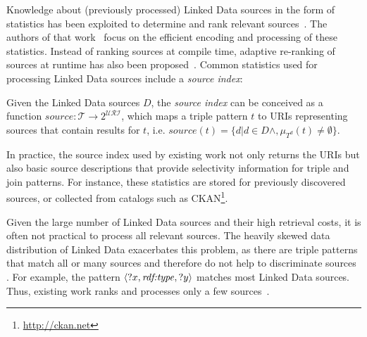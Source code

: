 Knowledge about (previously processed) Linked Data sources in the form of statistics has been exploited 
to determine and rank relevant sources~\cite{harth_data_2010}. 
The authors of that work~\cite{harth_data_2010} focus on the efficient
encoding and processing of these statistics. Instead of ranking
sources at compile time, adaptive re-ranking of sources at runtime has
also been proposed~\cite{ladwig_linked_2010}. Common statistics used
for processing Linked Data sources include a \emph{source index}:
\begin{definition}
  \label{def:index}
  Given the Linked Data sources $D$, the \emph{source index} can be
  conceived as a function $source : \mathcal{T} \to 2^\mathcal{URI}$,
  which maps a triple pattern $t$ to URIs representing sources that
  contain results for $t$, i.e. $source(t) = \{d| d \in D \wedge,
  \mu_{T^d}(t) \neq \emptyset \}$.
\end{definition}
In practice, the source index used by existing work not only returns
the URIs but also basic source descriptions that provide selectivity
information for triple and join patterns. For instance, these
statistics are stored for previously discovered sources, or collected
from catalogs such as
CKAN\footnote{\url{http://ckan.net}}.

Given the large number of Linked Data sources and their high retrieval costs, it is often not practical to process all relevant sources. The heavily skewed data
distribution of Linked Data exacerbates this problem, as there are
triple patterns that match all or many sources and therefore do not
help to discriminate sources \cite{ladwig_linked_2010}. For example, 
the pattern $\langle ?x, \mbox{\emph{rdf:type}}, ?y \rangle$ matches most Linked Data sources. Thus, existing work ranks and processes only a few sources~\cite{harth_data_2010,ladwig_linked_2010}.

